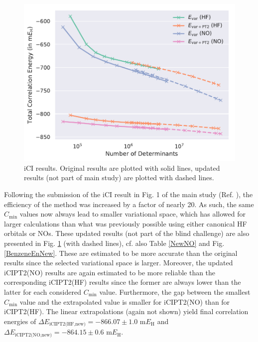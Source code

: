 \documentclass[journal=jcp,manuscript=suppinfo]{achemso}
\begin{document}
%
\begin{figure}[ht!]
\begin{center}
\includegraphics[scale=0.75]{figures/ici/ici.pdf}
\caption{iCI results. Original results are plotted with solid lines, updated results (not part of main study) are plotted with dashed lines.}
\label{ici_SI_fig}
\end{center}
\vspace{-0.6cm}
\end{figure}
%
Following the submission of the iCI result in Fig. 1 of the main study (Ref. ), the efficiency of the method was increased by a factor of nearly 20. As such, the same $C_{\text{min}}$ values now always lead to smaller variational space, which has allowed for larger calculations than what was previously possible using either canonical HF orbitals or NOs. These updated results (not part of the blind challenge) are also presented in Fig. \ref{ici_SI_fig} (with dashed lines), cf. also Table \ref{NewNO} and Fig. \ref{BenzeneEnNew}. These are estimated to be more accurate than the original results since the selected variational space is larger. Moreover, the updated iCIPT2(NO) results are again estimated to be more reliable than the corresponding iCIPT2(HF) results since the former are always lower than the latter for each considered $C_{\text{min}}$ value. Furthermore, the gap between the smallest $C_{\text{min}}$ value and the extrapolated value is smaller for iCIPT2(NO) than for iCIPT2(HF). The linear extrapolations (again not shown) yield final correlation energies of $\Delta E_{\text{iCIPT2(HF,new)}} = -866.07\pm1.0$ m$E_{\text{H}}$ and $\Delta E_{\text{iCIPT2(NO,new)}} = -864.15\pm0.6$ m$E_{\text{H}}$.\\
\end{document}
